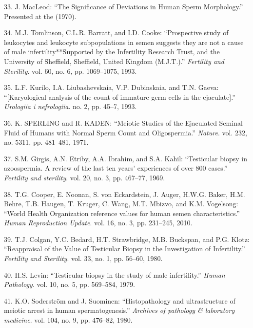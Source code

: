 \documentclass[12pt,twoside]{reedthesis}
\theoremstyle{definition}
\theoremstyle{definition}
\theoremstyle{remark}
\begin{document}
  \hypertarget{ref-MacLeod1970}{}
  33. J. MacLeod: ``The Significance of Deviations in Human Sperm
  Morphology.'' Presented at the (1970).
  
  \hypertarget{ref-Tomlinson1993}{}
  34. M.J. Tomlinson, C.L.R. Barratt, and I.D. Cooke: ``Prospective study
  of leukocytes and leukocyte subpopulations in semen suggests they are
  not a cause of male infertility**Supported by the Infertility Research
  Trust, and the University of Sheffield, Sheffield, United Kingdom
  (M.J.T.).'' \emph{Fertility and Sterility}. vol. 60, no. 6, pp.
  1069--1075, 1993.
  
  \hypertarget{ref-Kurilo}{}
  35. L.F. Kurilo, I.A. Liubashevskaia, V.P. Dubinskaia, and T.N. Gaeva:
  ``{[}Karyological analysis of the count of immature germ cells in the
  ejaculate{]}.'' \emph{Urologiia i nefrologiia}. no. 2, pp. 45--7, 1993.
  
  \hypertarget{ref-SPERLING1971}{}
  36. K. SPERLING and R. KADEN: ``Meiotic Studies of the Ejaculated
  Seminal Fluid of Humans with Normal Sperm Count and Oligospermia.''
  \emph{Nature}. vol. 232, no. 5311, pp. 481--481, 1971.
  
  \hypertarget{ref-Girgis}{}
  37. S.M. Girgis, A.N. Etriby, A.A. Ibrahim, and S.A. Kahil: ``Testicular
  biopsy in azoospermia. A review of the last ten years' experiences of
  over 800 cases.'' \emph{Fertility and sterility}. vol. 20, no. 3, pp.
  467--77, 1969.
  
  \hypertarget{ref-Cooper2010}{}
  38. T.G. Cooper, E. Noonan, S. von Eckardstein, J. Auger, H.W.G. Baker,
  H.M. Behre, T.B. Haugen, T. Kruger, C. Wang, M.T. Mbizvo, and K.M.
  Vogelsong: ``World Health Organization reference values for human semen
  characteristics.'' \emph{Human Reproduction Update}. vol. 16, no. 3, pp.
  231--245, 2010.
  
  \hypertarget{ref-Colgan1980}{}
  39. T.J. Colgan, Y.C. Bedard, H.T. Strawbridge, M.B. Buckspan, and P.G.
  Klotz: ``Reappraisal of the Value of Testicular Biopsy in the
  Investigation of Infertility.'' \emph{Fertility and Sterility}. vol. 33,
  no. 1, pp. 56--60, 1980.
  
  \hypertarget{ref-Levin1979}{}
  40. H.S. Levin: ``Testicular biopsy in the study of male infertility.''
  \emph{Human Pathology}. vol. 10, no. 5, pp. 569--584, 1979.
  
  \hypertarget{ref-Soderstrom1980}{}
  41. K.O. Soderström and J. Suominen: ``Histopathology and ultrastructure
  of meiotic arrest in human spermatogenesis.'' \emph{Archives of
  pathology \& laboratory medicine}. vol. 104, no. 9, pp. 476--82, 1980.
  
\end{document}
